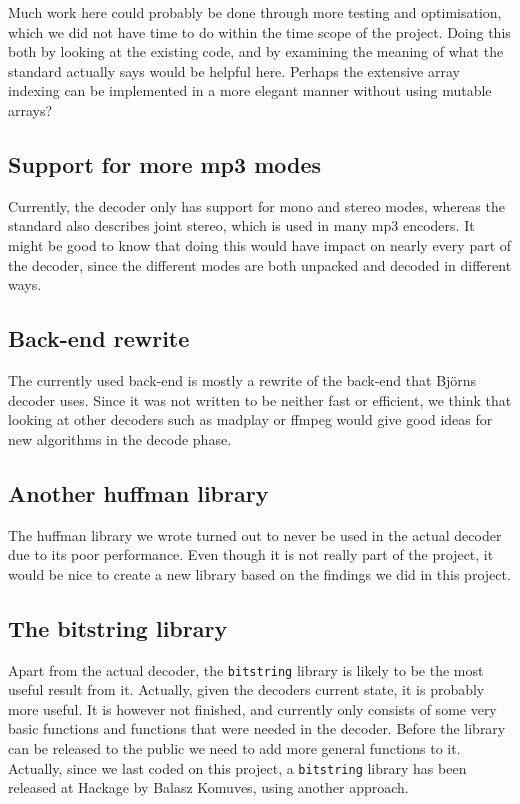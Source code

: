 \documentclass[a4paper,12pt]{article}
\begin{document}
        Much work here could probably be done through more testing and
        optimisation, which we did not have time to do within the time scope of
        the project. Doing this both by looking at the existing code, and by
        examining the meaning of what the standard actually says would be
        helpful here. Perhaps the extensive array indexing can be implemented in
        a more elegant manner without using mutable arrays?

    \subsection{Support for more mp3 modes}
        Currently, the decoder only has support for mono and stereo modes,
        whereas the standard also describes joint stereo, which is used in many
        mp3 encoders. It might be good to know that doing this would have impact
        on nearly every part of the decoder, since the different modes are both
        unpacked and decoded in different ways.

    \subsection{Back-end rewrite}
        The currently used back-end is mostly a rewrite of the back-end that
        Björns decoder uses. Since it was not written to be neither fast or
        efficient, we think that looking at other decoders such as madplay or
        ffmpeg would give good ideas for new algorithms in the decode phase.

    \subsection{Another huffman library}
        The huffman library we wrote turned out to never be used in the actual
        decoder due to its poor performance. Even though it is not really part
        of the project, it would be nice to create a new library based on the
        findings we did in this project.

    \subsection{The bitstring library}
        Apart from the actual decoder, the \texttt{bitstring} library is likely
        to be the most useful result from it. Actually, given the decoders
        current state, it is probably more useful. It is however not finished,
        and currently only consists of some very basic functions and functions
        that were needed in the decoder. Before the library can be released to
        the public we need to add more general functions to it. Actually, since
        we last coded on this project, a \texttt{bitstring} library has been
        released at Hackage by Balasz Komuves\cite{bitstring}, using another
        approach.
\end{document}
